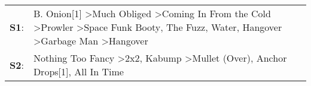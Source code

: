 \begin{supertabular}{p{0.03\textwidth}p{0.92\textwidth}}
 \textbf{S1}:  &  B. Onion[1]\textsuperscript{} \textgreater \enspace Much Obliged\textsuperscript{} \textgreater \enspace Coming In From the Cold\textsuperscript{} \textgreater \enspace Prowler\textsuperscript{} \textgreater \enspace Space Funk Booty\textsuperscript{}, \enspace The Fuzz\textsuperscript{}, \enspace Water\textsuperscript{}, \enspace Hangover\textsuperscript{} \textgreater \enspace Garbage Man\textsuperscript{} \textgreater \enspace Hangover\textsuperscript{}  \enspace  \\
 \textbf{S2}:  &                                                                                                                                                                                                                  Nothing Too Fancy\textsuperscript{} \textgreater \enspace 2x2\textsuperscript{}, \enspace Kabump\textsuperscript{} \textgreater \enspace Mullet (Over)\textsuperscript{}, \enspace Anchor Drops[1]\textsuperscript{}, \enspace All In Time\textsuperscript{}  \enspace  \\
\end{supertabular}
